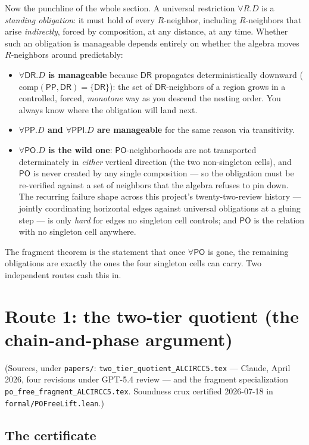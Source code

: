 \documentclass[11pt]{article}
\newcommand{\DR}{\ensuremath{\mathsf{DR}}}
\newcommand{\PO}{\ensuremath{\mathsf{PO}}}
\newcommand{\PP}{\ensuremath{\mathsf{PP}}}
\newcommand{\PPI}{\ensuremath{\mathsf{PPI}}}
\newcommand{\Comp}{\mathrm{comp}}
\newcommand{\code}[1]{\texttt{#1}}
\begin{document}
Now the punchline of the whole section. A universal restriction
$\forall R.D$ is a \emph{standing obligation}: it must hold of every
$R$-neighbor, including $R$-neighbors that arise \emph{indirectly},
forced by composition, at any distance, at any time. Whether such an
obligation is manageable depends entirely on whether the algebra moves
$R$-neighbors around predictably:
\begin{itemize}
\item \textbf{$\forall\DR.D$ is manageable} because $\DR$ propagates
  deterministically downward ($\Comp(\PP,\DR)=\{\DR\}$): the set of
  $\DR$-neighbors of a region grows in a controlled, forced,
  \emph{monotone} way as you descend the nesting order. You always know
  where the obligation will land next.
\item \textbf{$\forall\PP.D$ and $\forall\PPI.D$ are manageable} for
  the same reason via transitivity.
\item \textbf{$\forall\PO.D$ is the wild one}: $\PO$-neighborhoods are
  not transported determinately in \emph{either} vertical direction
  (the two non-singleton cells), and $\PO$ is never created by any
  single composition --- so the obligation must be re-verified against
  a set of neighbors that the algebra refuses to pin down. The
  recurring failure shape across this project's twenty-two-review
  history --- jointly coordinating horizontal edges against universal
  obligations at a gluing step --- is only \emph{hard} for edges no
  singleton cell controls; and $\PO$ is the relation with no singleton
  cell anywhere.
\end{itemize}

The fragment theorem is the statement that once $\forall\PO$ is gone,
the remaining obligations are exactly the ones the four singleton cells
can carry. Two independent routes cash this in.

\section{Route 1: the two-tier quotient (the chain-and-phase
argument)}\label{sec:route1}

{\small(Sources, under \code{papers/}:
\code{two\_tier\_quotient\_ALCIRCC5.tex} --- Claude, April 2026, four
revisions under GPT-5.4 review --- and the fragment specialization
\code{po\_free\_fragment\_ALCIRCC5.tex}. Soundness crux certified
2026-07-18 in \code{formal/POFreeLift.lean}.)}

\subsection{The certificate}\label{ssec:cert}
\end{document}
